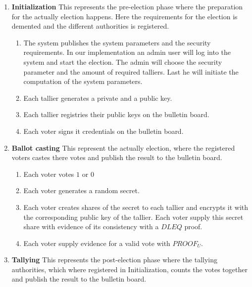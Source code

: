 \noindent
\begin{enumerate}
    \item \textbf{Initialization}
    This represents the pre-election phase where the preparation for the actually election happens. Here the requirements for the election is demented and the different authorities is registered. 
    
        \begin{enumerate}
            \item The system publishes the system parameters and the security requirements. In our implementation an admin user will log into the system and start the election. The admin will choose the security parameter and the amount of required talliers. Last he will initiate the computation of the system parameters.
            
            \item Each tallier generates a private and a public key.
            
            \item Each tallier registries their public keys on the bulletin board.
            
            \item Each voter signs it credentials on the bulletin board.
        \end{enumerate}
        
    \item \textbf{Ballot casting}
    This represent the actually election, where the registered voters castes there votes and publish the result to the bulletin board. 
    
        \begin{enumerate}
            \item Each voter votes $1$ or $0$
        
            \item Each voter generates a random secret.
        
            \item Each voter creates shares of the secret to each tallier and encrypts it with the corresponding public key of the tallier. Each voter supply this secret share with evidence of its consistency with a $DLEQ$ proof.
        
            \item Each voter supply evidence for a valid vote with $PROOF_U$.
        \end{enumerate}
        
    \item \textbf{Tallying} 
    This represents the post-election phase where the tallying authorities, which where registered in Initialization, counts the votes together and publish the result to the bulletin board.
    

\end{enumerate}
